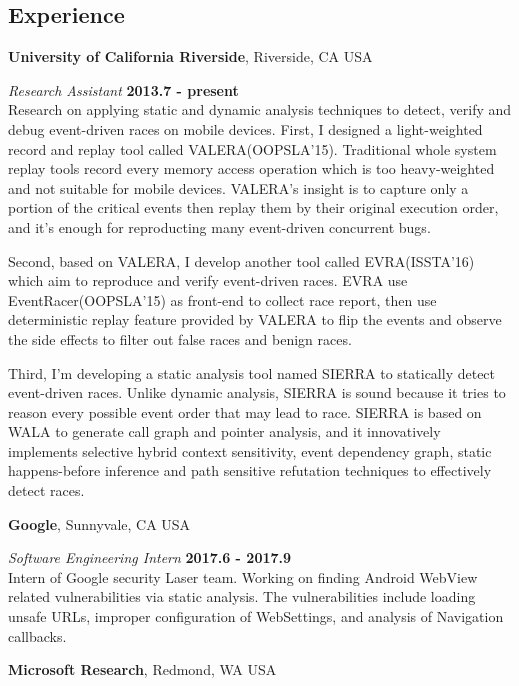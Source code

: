 \documentclass[margin,line]{res}
\begin{document}
\begin{resume}
\section{\sc Experience}
{\bf University of California Riverside}, Riverside, CA USA

\vspace{-.3cm}
{\em Research Assistant} \hfill {\bf 2013.7 - present}\\
Research on applying static and dynamic analysis techniques to detect, verify and debug
event-driven races on mobile devices.
First, I designed a light-weighted record and replay tool called VALERA(OOPSLA'15).
Traditional whole system replay tools record every memory access operation which is
too heavy-weighted and not suitable for mobile devices. VALERA's insight is to capture
only a portion of the critical events then replay them by their original execution order, 
and it's enough for reproducting many event-driven concurrent bugs.

\vspace{-.3cm}
Second, based on VALERA, I develop another tool called EVRA(ISSTA'16) which aim
to reproduce and verify event-driven races. EVRA use EventRacer(OOPSLA'15) as front-end
to collect race report, then use deterministic replay feature provided by VALERA to flip the
events and observe the side effects to filter out false races and benign races.

\vspace{-.3cm}
Third, I'm developing a static analysis tool named SIERRA to statically detect event-driven races.
Unlike dynamic analysis, SIERRA is sound because it tries to reason every possible event order
that may lead to race. SIERRA is based on WALA to generate call graph and pointer analysis,
and it innovatively implements selective hybrid context sensitivity, event dependency graph, static 
happens-before inference and path sensitive refutation techniques to effectively detect races.

{\bf Google}, Sunnyvale, CA USA

\vspace{-.3cm}
{\em Software Engineering Intern} \hfill {\bf 2017.6 - 2017.9}\\
Intern of Google security Laser team. Working on finding Android WebView related vulnerabilities
via static analysis. The vulnerabilities include loading unsafe URLs, improper configuration
of WebSettings, and analysis of Navigation callbacks.

{\bf Microsoft Research}, Redmond, WA USA


\end{resume}
\end{document}

